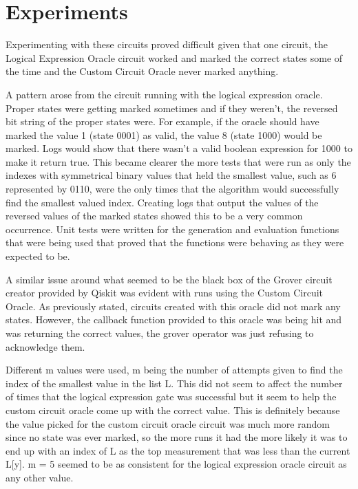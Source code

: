 \documentclass[11pt]{article}
\begin{document}
\newpage

\section{Experiments}

Experimenting with these circuits proved difficult given that one circuit, the Logical Expression Oracle circuit worked and marked the correct states some of the time and the Custom Circuit Oracle never marked anything.

A pattern arose from the circuit running with the logical expression oracle. Proper states were getting marked sometimes and if they weren't, the reversed bit string of the proper states were. For example, if the oracle should have marked the value 1 (state 0001) as valid, the value 8 (state 1000) would be marked. Logs would show that there wasn't a valid boolean expression for 1000 to make it return true. This became clearer the more tests that were run as only the indexes with symmetrical binary values that held the smallest value, such as 6 represented by 0110, were the only times that the algorithm would successfully find the smallest valued index. Creating logs that output the values of the reversed values of the marked states showed this to be a very common occurrence. Unit tests were written for the generation and evaluation functions that were being used that proved that the functions were behaving as they were expected to be.


A similar issue around what seemed to be the black box of the Grover circuit creator provided by Qiskit was evident with runs using the Custom Circuit Oracle. As previously stated, circuits created with this oracle did not mark any states. However, the callback function provided to this oracle was being hit and was returning the correct values, the grover operator was just refusing to acknowledge them.


Different m values were used, m being the number of attempts given to find the index of the smallest value in the list L. This did not seem to affect the number of times that the logical expression gate was successful but it seem to help the custom circuit oracle come up with the correct value. This is definitely because the value picked for the custom circuit oracle circuit was much more random since no state was ever marked, so the more runs it had the more likely it was to end up with an index of L as the top measurement that was less than the current L[y]. m = 5 seemed to be as consistent for the logical expression oracle circuit as any other value.
\end{document}

